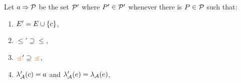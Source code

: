 \begin{definition}
  \label{def:prefix}
Let $a \mathbin\Rightarrow \mathcal{P}$ be the set $\mathcal{P}'$ where $P'\in\mathcal{P}'$ whenever
there is $P\in\mathcal{P}$ such that:
\begin{enumerate}
\item\label{pre-E} $E' = E \cup \{c\}$,
\item\label{pre-le} ${\le'}\supseteq{\le}$, %
\item\label{pre-gtN} ${\gtN'}\supseteq{\gtN}$, %
\item\label{pre-act} $\lambda_{\mathcal{A}}'(c) = a$ and $\lambda_{\mathcal{A}}'(e) = \lambda_{\mathcal{A}}(e)$,

\end{enumerate}
\end{definition}

